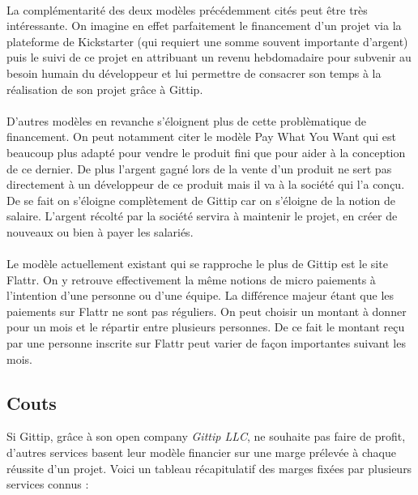 \paragraph{}
La complémentarité des deux modèles précédemment cités peut être très
intéressante. On
imagine en effet parfaitement le financement d'un projet via la plateforme de
Kickstarter (qui requiert une somme souvent importante d'argent) puis le suivi
de ce projet en attribuant un revenu hebdomadaire pour subvenir au besoin
humain du développeur et lui permettre de consacrer son temps à la réalisation
de son projet grâce à Gittip.

\paragraph{}
D'autres modèles en revanche s'éloignent plus de cette problèmatique de
financement. On peut notamment citer le modèle Pay What You Want qui est
beaucoup plus adapté pour vendre le produit fini que pour aider à la conception
de ce dernier. De plus l'argent gagné lors de la vente d'un produit ne sert pas
directement à un développeur de ce produit mais il va à la société qui l'a
conçu. De se fait on s'éloigne complètement de Gittip car on s'éloigne de la
notion de salaire. L'argent récolté par la société servira à maintenir le
projet, en créer de nouveaux ou bien à payer les salariés.

\paragraph{}
Le modèle actuellement existant qui se rapproche le plus de Gittip est le site
Flattr. On y retrouve effectivement la même notions de micro paiements à
l'intention d'une personne ou d'une équipe. La différence majeur étant que les
paiements sur Flattr ne sont pas réguliers. On peut choisir un montant à donner
pour un mois et le répartir entre plusieurs personnes. De ce fait le montant
reçu par une personne inscrite sur Flattr peut varier de façon importantes
suivant les mois.
\subsection{Couts}

Si Gittip, grâce à son open company \emph{Gittip LLC}, ne souhaite pas faire de
profit, d'autres services basent leur modèle financier sur une marge prélevée à
chaque réussite d'un projet. Voici un tableau récapitulatif des marges fixées
par plusieurs services connus :

